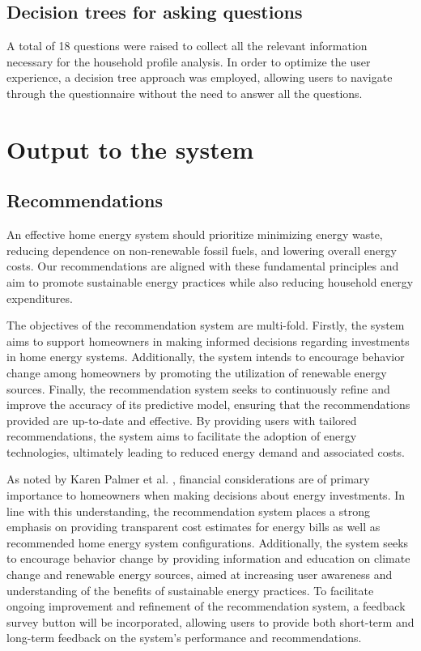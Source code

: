 \subsection{Decision trees for asking questions}

A total of 18 questions were raised to collect all the relevant information necessary for the household profile analysis. 
In order to optimize the user experience, a decision tree approach was employed, allowing users to navigate through the questionnaire without the need to answer all the questions. 


\section{Output to the system}

\subsection{Recommendations}

An effective home energy system should prioritize minimizing energy waste, reducing dependence on non-renewable fossil fuels, and lowering overall energy costs. Our recommendations are aligned with these fundamental principles and aim to promote sustainable energy practices while also reducing household energy expenditures. 

The objectives of the recommendation system are multi-fold. 
Firstly, the system aims to support homeowners in making informed decisions regarding investments in home energy systems. 
Additionally, the system intends to encourage behavior change among homeowners by promoting the utilization of renewable energy sources. 
Finally, the recommendation system seeks to continuously refine and improve the accuracy of its predictive model, ensuring that the recommendations provided are up-to-date and effective. 
By providing users with tailored recommendations, the system aims to facilitate the adoption of energy technologies, ultimately leading to reduced energy demand and associated costs. 

As noted by Karen Palmer et al. \cite{informationgap}, financial considerations are of primary importance to homeowners when making decisions about energy investments. 
In line with this understanding, the recommendation system places a strong emphasis on providing transparent cost estimates for energy bills as well as recommended home energy system configurations. 
Additionally, the system seeks to encourage behavior change by providing information and education on climate change and renewable energy sources, aimed at increasing user awareness and understanding of the benefits of sustainable energy practices. 
To facilitate ongoing improvement and refinement of the recommendation system, a feedback survey button will be incorporated, allowing users to provide both short-term and long-term feedback on the system's performance and recommendations. 

